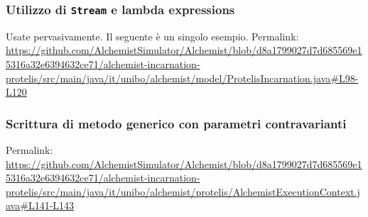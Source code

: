 \documentclass[a4paper,12pt]{report}
\begin{document}
\subsubsection{Utilizzo di \texttt{Stream} e lambda expressions}

Usate pervasivamente. Il seguente è un singolo esempio.
Permalink: \url{https://github.com/AlchemistSimulator/Alchemist/blob/d8a1799027d7d685569e15316a32e6394632ce71/alchemist-incarnation-protelis/src/main/java/it/unibo/alchemist/model/ProtelisIncarnation.java#L98-L120}

\subsubsection{Scrittura di metodo generico con parametri contravarianti}

Permalink: \url{https://github.com/AlchemistSimulator/Alchemist/blob/d8a1799027d7d685569e15316a32e6394632ce71/alchemist-incarnation-protelis/src/main/java/it/unibo/alchemist/protelis/AlchemistExecutionContext.java#L141-L143}

\nocite{*}


\end{document}
